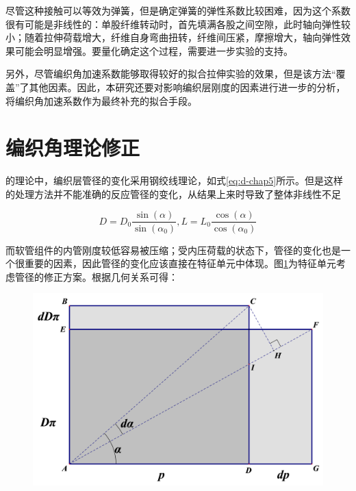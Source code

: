 尽管这种接触可以等效为弹簧，但是确定弹簧的弹性系数比较困难，因为这个系数很有可能是非线性的：单股纤维转动时，首先填满各股之间空隙，此时轴向弹性较小；随着拉伸荷载增大，纤维自身弯曲扭转，纤维间压紧，摩擦增大，轴向弹性效果可能会明显增强。要量化确定这个过程，需要进一步实验的支持。

另外，尽管编织角加速系数能够取得较好的拟合拉伸实验的效果，但是该方法“覆盖”了其他因素。因此，本研究还要对影响编织层刚度的因素进行进一步的分析，将编织角加速系数作为最终补充的拟合手段。


\section{编织角理论修正}
\ha 的理论中，编织层管径的变化采用钢绞线理论，如式\ref{eq:d-chap5}所示。但是这样的处理方法并不能准确的反应管径的变化，从结果上来时导致了整体非线性不足

\begin{equation}
\label{eq:d-chap5}
D = {D_0}\frac{{\sin \left( \alpha  \right)}}{{\sin \left( {{\alpha _0}} \right)}},
L = {L_0}\frac{{\cos \left( \alpha  \right)}}{{\cos \left( {{\alpha _0}} \right)}}
\end{equation}



而软管组件的内管刚度较低容易被压缩；受内压荷载的状态下，管径的变化也是一个很重要的因素，因此管径的变化应该直接在特征单元中体现。图\ref{fig:unit-cell-3}为特征单元考虑管径的修正方案。根据几何关系可得：

\begin{figure}[!htb]
\centering
\includegraphics[height=0.2\textheight]{figure/chap5/unit-cell-3}
\label{fig:unit-cell-3}
\end{figure}

